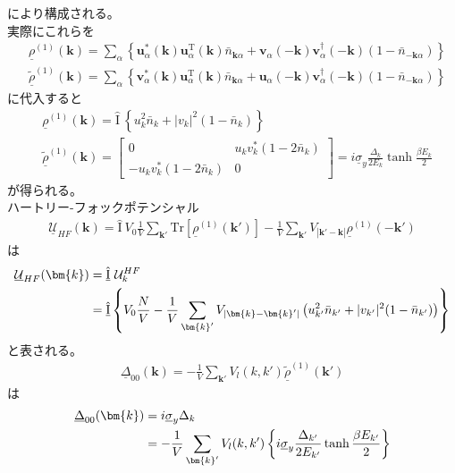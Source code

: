 \documentclass[dvipdfmx, 11pt, a4paper]{jsarticle}
\numberwithin{equation}{section}
\theoremstyle{definition}
\begin{document}
    により構成される。\\
    実際にこれらを
    \begin{align}
        &\underline{\rho}^{(1)}(\bm{k}) = \sum_{\alpha} \left\{ \bm{u}_\alpha^*(\bm{k})\bm{u}_\alpha^{\mathrm{T}}(\bm{k})\bar{n}_{\bm{k}\alpha} +\bm{v}_\alpha(-\bm{k})\bm{v}_\alpha^\dagger(-\bm{k})(1-\bar{n}_{-\bm{k}\alpha})  \right\} \\
        &\tilde{\underline{\rho}}^{(1)}(\bm{k}) = \sum_{\alpha} \left\{ \bm{v}_\alpha^*(\bm{k})\bm{u}_\alpha^{\mathrm{T}}(\bm{k})\bar{n}_{\bm{k}\alpha} +\bm{u}_\alpha(-\bm{k})\bm{v}_\alpha^\dagger(-\bm{k})(1-\bar{n}_{-\bm{k}\alpha}) \right\}
    \end{align}
    に代入すると
    \begin{align}
        &\underline{\rho}^{(1)}(\bm{k}) = \hat{\mathrm{I}}\ \left\{ u_k^2 \bar{n}_k + |v_k|^2(1-\bar{n}_k) \right\}\\
        &\tilde{\underline{\rho}}^{(1)}(\bm{k}) = 
        \left[ 
        \begin{matrix}
            0&u_kv^*_k(1-2\bar{n}_k)\\
            -u_kv_k^*(1-2\bar{n}_k)&0
        \end{matrix}
        \right] = i \underline{\sigma}_y \frac{\Delta_k}{2E_k}\tanh \frac{\beta E_k}{2}
    \end{align}
    が得られる。\\
    ハートリー-フォックポテンシャル
    \begin{align}
        \underline{\mathcal{U}}_{HF}(\bm{k}) = \hat{\mathrm{I}}\ V_{0}\frac{1}{V} \sum_{\bm{k}'}     \mathrm{Tr}[ \underline{\rho}^{(1)}(\bm{k}') ]   -  \frac{1}{V} \sum_{\bm{k}'} V_{|\bm{k}'-\bm{k}|}     \underline{\rho}^{(1)}(-\bm{k}')
    \end{align}
    は
    \begin{align}
        \underline{\mathcal{U}}_{HF}(\bm{k}) &= \hat{\underline{\mathrm{I}}}\ \mathcal{U}^{HF}_k \notag \\
        &= \hat{\underline{\mathrm{I}}} \left\{ V_0\frac{N}{V} - \frac{1}{V}\sum_{\bm{k}'}V_{|\bm{k}-\bm{k}'|}\left( u_{k'}^2 \bar{n}_{k'} + |v_{k'}|^2(1-\bar{n}_{k'}) \right)\right\}
    \end{align}
    と表される。
    \begin{align}
        \underline{\Delta}_{00}(\bm{k}) = -\frac{1}{V}  \sum_{\bm{k}'} V_l(k,k') \tilde{\underline{\rho}}^{(1)}(\bm{k}')
    \end{align}
    は
    \begin{align}
        \underline{\Delta}_{00}(\bm{k}) &= i\underline{\sigma}_y \Delta_k\notag \\
        &=-\frac{1}{V}  \sum_{\bm{k}'} V_l(k,k')\left\{  i \underline{\sigma}_y \frac{\Delta_{k'}}{2E_{k'}}\tanh \frac{\beta E_{k'}}{2}\right\}
    \end{align}
\end{document}
